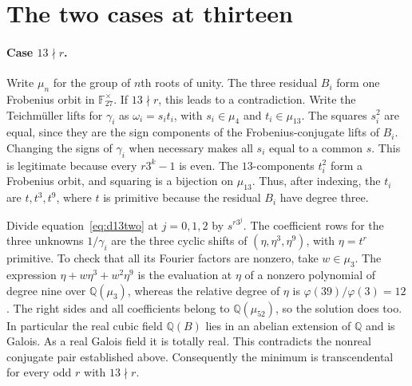 \documentclass[11pt]{article}
\begin{document}
\section{The two cases at thirteen}\paragraph{Case $13\nmid r$.}
Write $\mu_n$ for the group of $n$th roots of unity. The three residual $B_i$ form one Frobenius orbit in $\mathbb F_{27}^{\times}$. If $13\nmid r$,
this leads to a contradiction. Write the Teichm\"uller lifts for
$\gamma_i$ as $\omega_i=s_i t_i$, with $s_i\in\mu_4$ and
$t_i\in\mu_{13}$. The squares $s_i^2$ are equal, since they are
the sign components of the Frobenius-conjugate lifts of $B_i$.
Changing the signs of $\gamma_i$ when necessary makes all $s_i$ equal
to a common $s$. This is legitimate because every $r3^k-1$ is even.
The $13$-components $t_i^2$ form a Frobenius orbit, and squaring is
a bijection on $\mu_{13}$. Thus, after indexing, the $t_i$ are
$t,t^3,t^9$, where $t$ is primitive because the residual $B_i$
have degree three.

Divide equation~\eqref{eq:d13two} at $j=0,1,2$ by $s^{r3^j}$.
The coefficient rows for the three unknowns $1/\gamma_i$ are the
three cyclic shifts of $(\eta,\eta^3,\eta^9)$, with $\eta=t^r$
primitive. To check that all its Fourier factors are nonzero, take
$w\in\mu_3$. The expression $\eta+w\eta^3+w^2\eta^9$ is the
evaluation at $\eta$ of a nonzero polynomial of degree nine over
$\mathbb Q(\mu_3)$, whereas the relative degree of $\eta$ is
$\varphi(39)/\varphi(3)=12$. The right sides and all coefficients
belong to $\mathbb Q(\mu_{52})$, so the solution does too. In
particular the real cubic field $\mathbb Q(B)$ lies in an
abelian extension of $\mathbb Q$ and is Galois. As a real Galois
field it is totally real. This contradicts the nonreal conjugate
pair established above. Consequently the minimum is transcendental
for every odd $r$ with $13\nmid r$.
\end{document}
